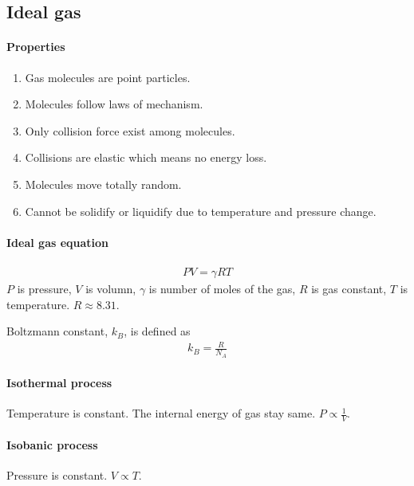     \subsection{Ideal gas}
        \paragraph{Properties}
            \begin{enumerate}
                \item Gas molecules are point particles.
                \item Molecules follow laws of mechanism.
                \item Only collision force exist among molecules.
                \item Collisions are elastic which means no energy loss.
                \item Molecules move totally random.
                \item Cannot be solidify or liquidify due to temperature and pressure change.
            \end{enumerate}
        
        \paragraph{Ideal gas equation}
            \begin{align}
                P V = \gamma R T
            \end{align}
            $P$ is pressure, $V$ is volumn, $\gamma$ is number of moles of the gas, $R$ is gas constant, $T$ is temperature. $R \approx 8.31$.

            Boltzmann constant, $k_B$, is defined as 
            \begin{align}
                k_B = \frac{R}{N_A}
            \end{align}

        \paragraph{Isothermal process}
            Temperature is constant. The internal energy of gas stay same. $P \propto \frac{1}{V}$.

        \paragraph{Isobanic process}
            Pressure is constant. $V \propto T$.
            
